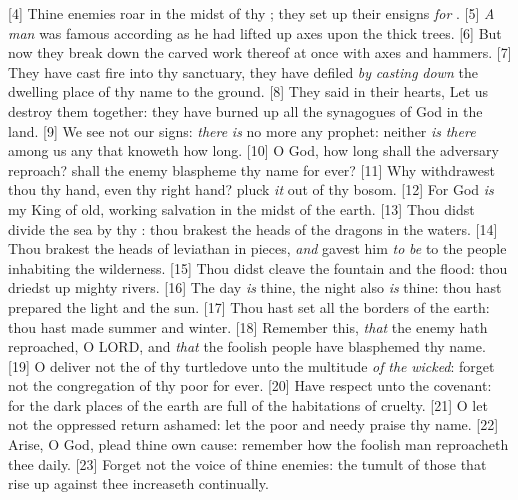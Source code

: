 [4] \textcolor[cmyk]{0.99998,1,0,0}{Thine enemies roar in the midst of thy ; they set up their ensigns \emph{for} .}
[5] \textcolor[cmyk]{0.99998,1,0,0}{\emph{A} \emph{man} was famous according as he had lifted up axes upon the thick trees.}
[6] \textcolor[cmyk]{0.99998,1,0,0}{But now they break down the carved work thereof at once with axes and hammers.}
[7] \textcolor[cmyk]{0.99998,1,0,0}{They have cast fire into thy sanctuary, they have defiled \emph{by} \emph{casting} \emph{down} the dwelling place of thy name to the ground.}
[8] \textcolor[cmyk]{0.99998,1,0,0}{They said in their hearts, Let us destroy them together: they have burned up all the synagogues of God in the land.}
[9] \textcolor[cmyk]{0.99998,1,0,0}{We see not our signs: \emph{there} \emph{is} no more any prophet: neither \emph{is} \emph{there} among us any that knoweth how long.}
[10] \textcolor[cmyk]{0.99998,1,0,0}{O God, how long shall the adversary reproach? shall the enemy blaspheme thy name for ever?}
[11] \textcolor[cmyk]{0.99998,1,0,0}{Why withdrawest thou thy hand, even thy right hand? pluck \emph{it} out of thy bosom.}
[12] \textcolor[cmyk]{0.99998,1,0,0}{For God \emph{is} my King of old, working salvation in the midst of the earth.}
[13] \textcolor[cmyk]{0.99998,1,0,0}{Thou didst divide the sea by thy : thou brakest the heads of the dragons in the waters.}
[14] \textcolor[cmyk]{0.99998,1,0,0}{Thou brakest the heads of leviathan in pieces, \emph{and} gavest him \emph{to} \emph{be}  to the people inhabiting the wilderness.}
[15] \textcolor[cmyk]{0.99998,1,0,0}{Thou didst cleave the fountain and the flood: thou driedst up mighty rivers.}
[16] \textcolor[cmyk]{0.99998,1,0,0}{The day \emph{is} thine, the night also \emph{is} thine: thou hast prepared the light and the sun.}
[17] \textcolor[cmyk]{0.99998,1,0,0}{Thou hast set all the borders of the earth: thou hast made summer and winter.}
[18] \textcolor[cmyk]{0.99998,1,0,0}{Remember this, \emph{that} the enemy hath reproached, O LORD, and \emph{that} the foolish people have blasphemed thy name.}
[19] \textcolor[cmyk]{0.99998,1,0,0}{O deliver not the  of thy turtledove unto the multitude \emph{of} \emph{the} \emph{wicked}: forget not the congregation of thy poor for ever.}
[20] \textcolor[cmyk]{0.99998,1,0,0}{Have respect unto the covenant: for the dark places of the earth are full of the habitations of cruelty.}
[21] \textcolor[cmyk]{0.99998,1,0,0}{O let not the oppressed return ashamed: let the poor and needy praise thy name.}
[22] \textcolor[cmyk]{0.99998,1,0,0}{Arise, O God, plead thine own cause: remember how the foolish man reproacheth thee daily.}
[23] \textcolor[cmyk]{0.99998,1,0,0}{Forget not the voice of thine enemies: the tumult of those that rise up against thee increaseth continually.}




